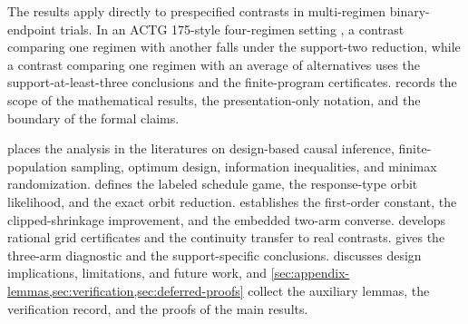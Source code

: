 The results apply directly to prespecified contrasts in multi-regimen binary-endpoint trials. In an ACTG 175-style four-regimen setting \citep{hammer_et_al_1996_actg175}, a contrast comparing one regimen with another falls under the support-two reduction, while a contrast comparing one regimen with an average of alternatives uses the support-at-least-three conclusions and the finite-program certificates.  records the scope of the mathematical results, the presentation-only notation, and the boundary of the formal claims.

 places the analysis in the literatures on design-based causal inference, finite-population sampling, optimum design, information inequalities, and minimax randomization.  defines the labeled schedule game, the response-type orbit likelihood, and the exact orbit reduction.  establishes the first-order constant, the clipped-shrinkage improvement, and the embedded two-arm converse.  develops rational grid certificates and the continuity transfer to real contrasts.  gives the three-arm diagnostic and the support-specific conclusions.  discusses design implications, limitations, and future work, and \cref{sec:appendix-lemmas,sec:verification,sec:deferred-proofs} collect the auxiliary lemmas, the verification record, and the proofs of the main results.
